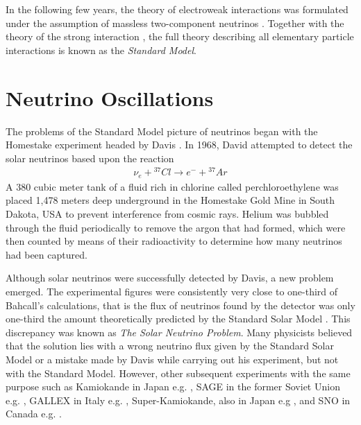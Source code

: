 \documentclass[english]{article}
\begin{document}
    In the following few years, the theory of electroweak interactions was formulated under the assumption of massless two-component neutrinos \cite{glashow1961} \cite{goldstonesalamweinberg1962} \cite{weinberg1967}. Together with the theory of the strong interaction \cite{grosswilczek1973} \cite{politzer1973}, the full theory describing all elementary particle interactions is known as the \textit{Standard Model}.

\section{Neutrino Oscillations}
	The problems of the Standard Model picture of neutrinos began with the Homestake experiment headed by Davis \cite{davis1968}. In 1968, David attempted to detect the solar neutrinos based upon the reaction
    \begin{gather}
    	\nu_{e} + {}^{37} Cl \rightarrow e^{-} + {}^{37} Ar
    \end{gather}
    A 380 cubic meter tank of a fluid rich in chlorine called perchloroethylene was placed 1,478 meters deep underground in the Homestake Gold Mine in South Dakota, USA to prevent interference from cosmic rays. Helium was bubbled through the fluid periodically to remove the argon that had formed, which were then counted by means of their radioactivity to determine how many neutrinos had been captured.
    
    Although solar neutrinos were successfully detected by Davis, a new problem emerged. The experimental figures were consistently very close to one-third of Bahcall's calculations, that is the flux of neutrinos found by the detector was only one-third the amount theoretically predicted by the Standard Solar Model \cite{davis1998} \cite{bahcall2004}. This discrepancy was known as \textit{The Solar Neutrino Problem}. Many physicists believed that the solution lies with a wrong neutrino flux given by the Standard Solar Model or a mistake made by Davis while carrying out his experiment, but not with the Standard Model. However, other subsequent experiments with the same purpose such as Kamiokande in Japan e.g. \cite{kamiokande1991}, SAGE in the former Soviet Union e.g. \cite{sage1991}, GALLEX in Italy e.g. \cite{gallex1999}, Super-Kamiokande, also in Japan e.g \cite{superk2016}, and SNO in Canada e.g. \cite{sno2001}.
\end{document}
